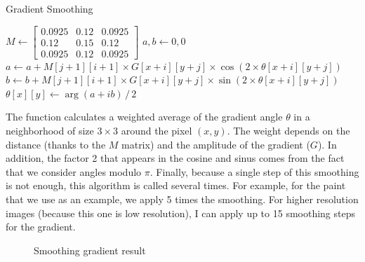 \documentclass[10pt]{article}
\begin{document}
	\begin{algorithm}
		\caption{Gradient Smoothing}
		\label{alg:magn}
		\begin{algorithmic}
			\State $M \gets \begin{bmatrix}
				0.0925 & 0.12 & 0.0925 \\
				0.12 & 0.15 & 0.12 \\
				0.0925 & 0.12 & 0.0925
			\end{bmatrix}$
			\State $a, b \gets 0, 0$
				\State $a \gets a + M[j+1][i+1] \times G[x+i][y+j] \times \cos \left( 2 \times \theta[x+i][y+j] \right)$
				\State $b \gets b + M[j+1][i+1] \times G[x+i][y+j] \times \sin \left( 2 \times \theta[x+i][y+j] \right)$
			\EndFor
			\State $\theta[x][y] \gets \arg \left( a + ib \right) \, / \, 2$
			\EndFunction
		\end{algorithmic}
	\end{algorithm}

	The function calculates a weighted average of the gradient angle $\theta$ in a neighborhood of size $3 \times 3$ around the pixel $(x, y)$. The weight depends on the distance (thanks to the $M$ matrix) and the amplitude of the gradient ($G$). In addition, the factor 2 that appears in the cosine and sinus comes from the fact that we consider angles modulo $\pi$. Finally, because a single step of this smoothing is not enough, this algorithm is called several times. For example, for the paint that we use as an example, we apply 5 times the smoothing. For higher resolution images (because this one is low resolution), I can apply up to 15 smoothing steps for the gradient.
	
	\begin{figure}[h]
		\centering
		\vspace{-3mm}
		\caption{Smoothing gradient result}
	\end{figure}
	
\end{document}
